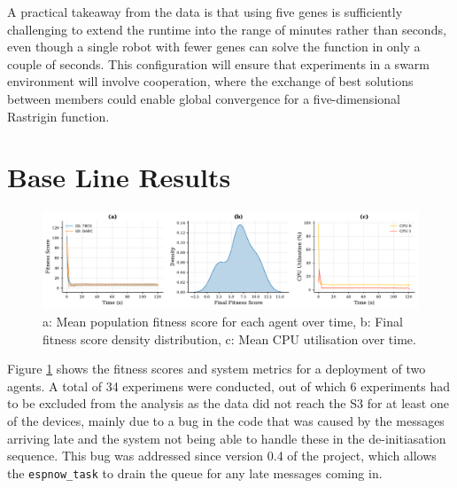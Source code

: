 \documentclass[conference]{IEEEtran}
\begin{document}
A practical takeaway from the data is that using five genes is sufficiently challenging to extend the runtime into the range of minutes rather than seconds, even though a single robot with fewer genes can solve the function in only a couple of seconds. This configuration will ensure that experiments in a swarm environment will involve cooperation, where the exchange of best solutions between members could enable global convergence for a five-dimensional Rastrigin function.

\newpage
\section{Base Line Results}

\begin{figure}[t]
  \centering
  \includegraphics[width=1\textwidth]{base_fitness_stats.pdf}
  \caption{a: Mean population fitness score for each agent over time,  b: Final fitness score density distribution, c: Mean CPU utilisation over time.}
  \label{fig:base_fitness_stats}
\end{figure}

Figure \ref{fig:base_fitness_stats} shows the fitness scores and system metrics for a deployment of two agents. A total of 34 experimens were conducted, out of which 6 experiments had to be excluded from the analysis as the data did not reach the S3 for at least one of the devices, mainly due to a bug in the code that was caused by the messages arriving late and the system not being able to handle these in the de-initiasation sequence. This bug was addressed since version 0.4 of the project, which allows the \texttt{espnow\_task} to drain the queue for any late messages coming in.\\
\end{document}

